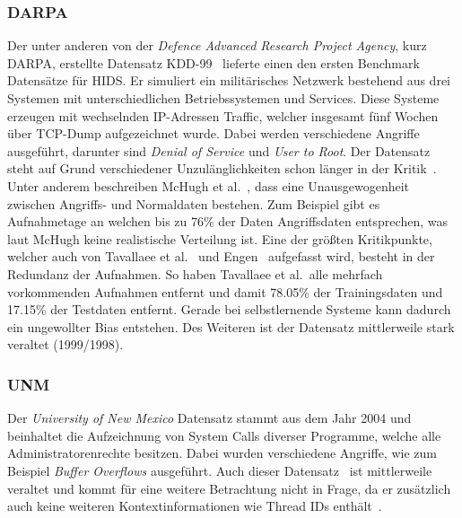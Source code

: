             \subsubsection{DARPA}
                Der unter anderen von der \textit{Defence Advanced Research Project Agency}, kurz DARPA, erstellte Datensatz KDD-99~\cite{DARPA} lieferte einen den ersten Benchmark Datensätze für \ac{HIDS}.
                Er simuliert ein militärisches Netzwerk bestehend aus drei Systemen mit unterschiedlichen Betriebssystemen und Services.
                Diese Systeme erzeugen mit wechselnden IP-Adressen Traffic, welcher insgesamt fünf Wochen über TCP-Dump aufgezeichnet wurde.
                Dabei werden verschiedene Angriffe ausgeführt, darunter sind \textit{Denial of Service} und \textit{User to Root}.
                Der Datensatz steht auf Grund verschiedener Unzulänglichkeiten schon länger in der Kritik~\cite{KDDCRITIC, UNM, KDDCRITIC2}.
                Unter anderem beschreiben McHugh et al.~\cite{KDDMCHUGH}, dass eine Unausgewogenheit zwischen Angriffs- und Normaldaten bestehen.
                Zum Beispiel gibt es Aufnahmetage an welchen bis zu 76\% der Daten Angriffsdaten entsprechen, was laut McHugh keine realistische Verteilung ist.
                Eine der größten Kritikpunkte, welcher auch von Tavallaee et al.~\cite{KDDCRITIC2} und Engen~\cite{ENGEN2010} aufgefasst wird, besteht in der Redundanz der Aufnahmen.
                So haben Tavallaee et al.\ alle mehrfach vorkommenden Aufnahmen entfernt und damit 78.05\% der Trainingsdaten und 17.15\% der Testdaten entfernt.
                Gerade bei selbstlernende Systeme kann dadurch ein ungewollter Bias entstehen.
                Des Weiteren ist der Datensatz mittlerweile stark veraltet (1999/1998).
            \subsubsection{UNM}
                Der \textit{University of New Mexico} Datensatz stammt aus dem Jahr 2004 und beinhaltet die Aufzeichnung von System Calls diverser Programme, welche alle Administratorenrechte besitzen.
                Dabei wurden verschiedene Angriffe, wie zum Beispiel \textit{Buffer  Overflows} ausgeführt.
                Auch dieser Datensatz~\cite{UNM} ist mittlerweile veraltet und kommt für eine weitere Betrachtung nicht in Frage,
                da er zusätzlich auch keine weiteren Kontextinformationen wie Thread IDs enthält~\cite{UNMcritic}.
